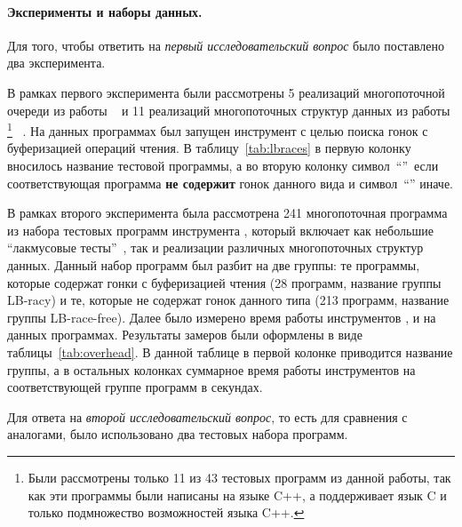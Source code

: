 \paragraph{Эксперименты и наборы данных.} 

Для того, чтобы ответить на \emph{первый исследовательский вопрос} 
было поставлено два эксперимента. 

В рамках первого эксперимента были рассмотрены 
5 реализаций многопоточной очереди из работы%
~\cite{Kokologiannakis:PLDI2019}
и 11 реализаций многопоточных структур данных из работы%
\footnote{Были рассмотрены только 11 из 43 
тестовых программ из данной работы, 
так как эти программы были написаны на языке C++,
а \genmc поддерживает язык C и только подмножество возможностей языка C++.}
~\cite{Ou-Demsky:OOPSLA18}.
На данных программах был запущен инструмент \wmc с целью 
поиска гонок с буферизацией операций чтения.
В таблицу~\ref{tab:lbraces} в первую колонку
вносилось название тестовой программы, 
а во вторую колонку символ~``\cmark''~если соответствующая 
программа \textbf{не содержит} гонок данного вида и символ~``\xmark'' иначе.

В рамках второго эксперимента была рассмотрена 241 многопоточная программа 
из набора тестовых программ инструмента \genmc, 
который включает как небольшие ``лакмусовые тесты''~\cite{Alglave-al:TACAS2011}, 
так и реализации различных многопоточных структур данных.
Данный набор программ был разбит на две группы:
те программы, которые содержат гонки с буферизацией чтения 
(28 программ, название группы LB-racy)
и те, которые не содержат гонок данного типа 
(213 программ, название группы LB-race-free).
Далее было измерено время работы инструментов \genmc, \hmc и \wmc на данных программах.  
Результаты замеров были оформлены в виде таблицы~\ref{tab:overhead}.
В данной таблице в первой колонке приводится название группы, 
а в остальных колонках суммарное время работы инструментов 
на соответствующей группе программ в секундах.





Для ответа на \emph{второй исследовательский вопрос}, 
то есть для сравнения \wmc с аналогами, 
было использовано два тестовых набора программ.


